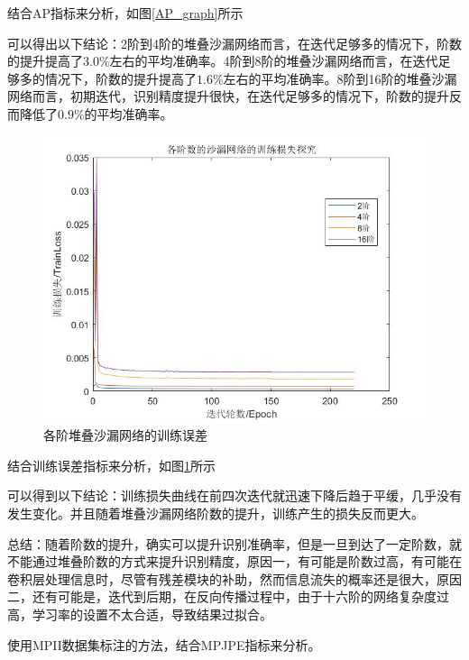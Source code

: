 结合AP指标来分析，如图\ref{AP_graph}所示

可以得出以下结论：2阶到4阶的堆叠沙漏网络而言，在迭代足够多的情况下，阶数的提升提高了$3.0\%$左右的平均准确率。4阶到8阶的堆叠沙漏网络而言，在迭代足够多的情况下，阶数的提升提高了$1.6\%$左右的平均准确率。8阶到16阶的堆叠沙漏网络而言，初期迭代，识别精度提升很快，在迭代足够多的情况下，阶数的提升反而降低了$0.9\%$的平均准确率。

\begin{figure}[h]
	\includegraphics[width=\textwidth]{pic/stacked_hourglass_trainloss.jpg}
	\caption{各阶堆叠沙漏网络的训练误差}
	\label{Loss_graph}
\end{figure}

结合训练误差指标来分析，如图\ref{Loss_graph}所示

可以得到以下结论：训练损失曲线在前四次迭代就迅速下降后趋于平缓，几乎没有发生变化。并且随着堆叠沙漏网络阶数的提升，训练产生的损失反而更大。

总结：随着阶数的提升，确实可以提升识别准确率，但是一旦到达了一定阶数，就不能通过堆叠阶数的方式来提升识别精度，原因一，有可能是阶数过高，有可能在卷积层处理信息时，尽管有残差模块的补助，然而信息流失的概率还是很大，原因二，还有可能是，迭代到后期，在反向传播过程中，由于十六阶的网络复杂度过高，学习率的设置不太合适，导致结果过拟合。

使用MPII数据集标注的方法，结合MPJPE指标来分析。


